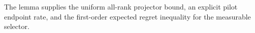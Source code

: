 The lemma supplies the uniform all-rank projector bound, an explicit pilot endpoint rate, and the first-order expected regret inequality for the measurable selector.